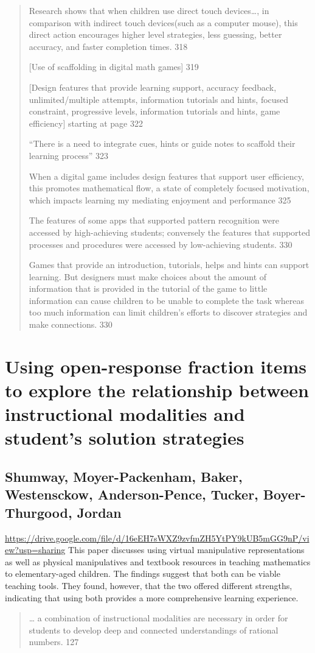 \documentclass[12pt]{extarticle}
\begin{document}
{\begin{quote}
    Research shows that when children use direct touch devices…, in comparison with indirect touch devices(such as a computer mouse), this direct action encourages higher level strategies, less guessing, better accuracy, and faster completion times. 318
    
    [Use of scaffolding in digital math games] 319
    
    [Design features that provide learning support, accuracy feedback, unlimited/multiple attempts, information tutorials and hints, focused constraint, progressive levels, information tutorials and hints, game efficiency] starting at page 322
    
    “There is a need to integrate cues, hints or guide notes to scaffold their learning process” 323
    
    When a digital game  includes design features that support user efficiency, this promotes mathematical flow, a state of completely focused motivation, which impacts learning my mediating enjoyment and performance 325
    
    The features of some apps that supported pattern recognition were accessed by high-achieving students; conversely the features that supported processes and procedures were accessed by low-achieving students. 	330
    
    Games that provide an introduction, tutorials, helps and hints can support learning. But designers must make choices about the amount of information that is provided in the tutorial of the game to little information can cause children to be unable to complete the task whereas too much information can limit children’s efforts to discover strategies and make connections.	330
\end{quote}    

\section*{Using open-response fraction items to explore the relationship between instructional modalities and student’s solution strategies}
\subsection*{Shumway, Moyer-Packenham, Baker, Westensckow, Anderson-Pence, Tucker, Boyer-Thurgood, Jordan} 
\url{https://drive.google.com/file/d/16eEH7sWXZ9zvfmZH5YtPY9kUB5mGG9nP/view?usp=sharing} 
This paper discusses using virtual manipulative representations as well as physical manipulatives and textbook resources in teaching mathematics to elementary-aged children. The findings suggest that both can be viable teaching tools. They found, however, that the two offered different strengths, indicating that using both provides a more comprehensive learning experience.
\begin{quote}
    … a combination of instructional modalities are necessary in order for students to develop deep and connected understandings of rational numbers. 127
\end{quote}

}
\end{document}
